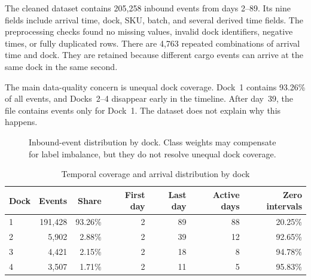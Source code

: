 \documentclass[10pt]{article}
\begin{document}
The cleaned dataset contains 205,258 inbound events from days 2--89. Its nine fields include arrival time, dock, SKU, batch, and several derived time fields. The preprocessing checks found no missing values, invalid dock identifiers, negative times, or fully duplicated rows. There are 4,763 repeated combinations of arrival time and dock. They are retained because different cargo events can arrive at the same dock in the same second.

The main data-quality concern is unequal dock coverage. Dock~1 contains 93.26\% of all events, and Docks~2--4 disappear early in the timeline. After day~39, the file contains events only for Dock~1. The dataset does not explain why this happens.

\begin{figure}[H]
\centering
{}
\caption{Inbound-event distribution by dock. Class weights may compensate for label imbalance, but they do not resolve unequal dock coverage.}
\label{fig:dock-distribution}
\end{figure}

\begin{table}[H]
\centering
\caption{Temporal coverage and arrival distribution by dock}
\label{tab:dock-coverage}
\small
\begin{tabular}{lrrrrrr}
\toprule
Dock & Events & Share & First day & Last day & Active days & Zero intervals \\
\midrule
1 & 191,428 & 93.26\% & 2 & 89 & 88 & 20.25\% \\
2 & 5,902 & 2.88\% & 2 & 39 & 12 & 92.65\% \\
3 & 4,421 & 2.15\% & 2 & 18 & 8 & 94.78\% \\
4 & 3,507 & 1.71\% & 2 & 11 & 5 & 95.83\% \\
\bottomrule
\end{tabular}
\end{table}
\end{document}
